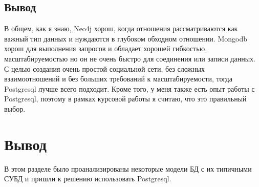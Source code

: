 \subsection*{Вывод}

В общем, как я знаю, Neo4j хорош, когда отношения рассматриваются как важный тип данных и нуждаются в глубоком обходном отношении.
Mongodb хорош для выполнения запросов и обладает хорошей гибкостью, масштабируемостью но он не очень быстро для соединения или записи данных.
С целью создания очень простой социальной сети, без сложных взаимоотношений и без больших требований к масштабируемости, тогда Postgresql лучше всего подходит.
Кроме того, у меня также есть опыт работы с Postgresql, поэтому в рамках курсовой работы я считаю, что это правильный выбор.




\section{Вывод}

В этом разделе было проанализированы некоторые модели БД с их типичными СУБД и пришли к решению использовать Postgresql.

